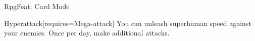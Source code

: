 \begin{ExampleBlock}{RpgFeat: Card Mode}
\begin{RpgFeat}[width=5cm, height=6cm]{Hyperattack}[requires={Mega-attack}]
    You can unleash superhuman speed against your enemies. Once per day, make  additional attacks.
\end{RpgFeat}


\end{ExampleBlock}
